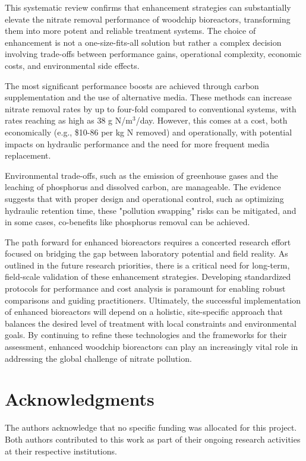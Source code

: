 \documentclass[12pt,a4paper]{article}
\begin{document}
This systematic review confirms that enhancement strategies can substantially elevate the nitrate removal performance of woodchip bioreactors, transforming them into more potent and reliable treatment systems. The choice of enhancement is not a one-size-fits-all solution but rather a complex decision involving trade-offs between performance gains, operational complexity, economic costs, and environmental side effects.

The most significant performance boosts are achieved through carbon supplementation and the use of alternative media. These methods can increase nitrate removal rates by up to four-fold compared to conventional systems, with rates reaching as high as 38 g N/m$^3$/day. However, this comes at a cost, both economically (e.g., \$10-86 per kg N removed) and operationally, with potential impacts on hydraulic performance and the need for more frequent media replacement.

Environmental trade-offs, such as the emission of greenhouse gases and the leaching of phosphorus and dissolved carbon, are manageable. The evidence suggests that with proper design and operational control, such as optimizing hydraulic retention time, these "pollution swapping" risks can be mitigated, and in some cases, co-benefits like phosphorus removal can be achieved.

The path forward for enhanced bioreactors requires a concerted research effort focused on bridging the gap between laboratory potential and field reality. As outlined in the future research priorities, there is a critical need for long-term, field-scale validation of these enhancement strategies. Developing standardized protocols for performance and cost analysis is paramount for enabling robust comparisons and guiding practitioners. Ultimately, the successful implementation of enhanced bioreactors will depend on a holistic, site-specific approach that balances the desired level of treatment with local constraints and environmental goals. By continuing to refine these technologies and the frameworks for their assessment, enhanced woodchip bioreactors can play an increasingly vital role in addressing the global challenge of nitrate pollution.

\section{Acknowledgments}

The authors acknowledge that no specific funding was allocated for this project. Both authors contributed to this work as part of their ongoing research activities at their respective institutions.



\end{document}

